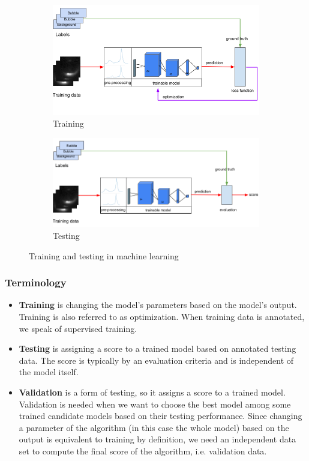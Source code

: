 		\begin{figure}
			\centering
			\begin{subfigure}[b]{0.55\textwidth}
				\includegraphics[scale=.5]{images/training_intro.png}
				\caption{Training}
			\end{subfigure}
			\begin{subfigure}[b]{0.55\textwidth}
				\includegraphics[scale=.5]{images/testing_intro.png}
				\caption{Testing}
			\end{subfigure}
			\caption{Training and testing in machine learning}
			\label{fig:machine_learning_intro}
		\end{figure}				
		
		
		\subsubsection{Terminology}
			\begin{itemize} 
				\item \textbf{Training} is changing the model's parameters based on the model's output. Training is also referred to as optimization. When training data is annotated, we speak of supervised training. 
				\item \textbf{Testing} is assigning a score to a trained model based on annotated testing data. The score is typically by an evaluation criteria and is independent of the model itself. 
				\item \textbf{Validation} is a form of testing, so it assigns a score to a trained model. Validation is needed when we want to choose the best model among some trained candidate models based on their testing performance. Since changing a parameter of the algorithm (in this case the whole model) based on the output is equivalent to training by definition, we need an independent data set to compute the final score of the algorithm, i.e. validation data. 
			\end{itemize}				
			
